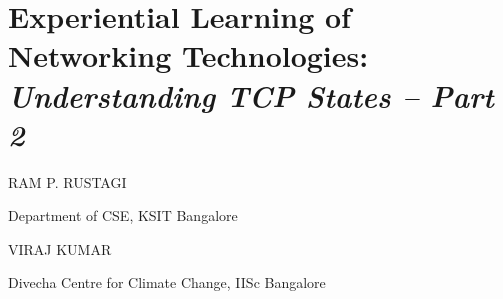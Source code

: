 \chapter{Experiential Learning of Networking Technologies:\\ {\LARGE\sl Understanding TCP States -- Part 2}}

\begin{center}
\uppercase{Ram P. Rustagi}

\vskip -7pt

Department of CSE, KSIT Bangalore

\medskip

{\large\uppercase {Viraj Kumar}}

\vskip -7pt

Divecha Centre for Climate Change, IISc Bangalore
\end{center}

\noindent{}


